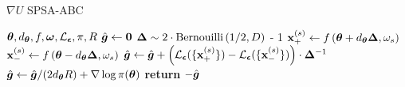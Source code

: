 \begin{algorithm}[t]
	\caption{$\nabla U$ SPSA-ABC}\label{algo:spsa}
	\begin{algorithmic}
		 ${\bm \theta}, d_{{\bm \theta}}, f, {\bm \omega}, \mathcal{L}_{{\bm {\epsilon}}}, \pi, R$ 
		\STATE $\hat{{\bm g }} \leftarrow {\bm 0}$
        \STATE ${\bm \Delta} \sim 2 \cdot \text{Bernouilli}\left( 1/2, D \right)$ - 1
          \STATE ${\bf x}^{(s)}_{+} \leftarrow f\left( {\bm \theta} + d_{{\bm \theta}} {\bm \Delta}, \omega_s \right)$
          \STATE ${\bf x}^{(s)}_{-} \leftarrow f\left( {\bm \theta} - d_{{\bm \theta}} {\bm \Delta}, \omega_s \right)$
        \ENDFOR
        \STATE $\hat{{\bm g }} \leftarrow \hat{{\bm g }} + \left( \mathcal{L}_{{\bm {\epsilon}}}( \{{\bf x}^{(s)}_{+}\}) - \mathcal{L}_{{\bm {\epsilon}}}( \{{\bf x}^{(s)}_{-}\}) \right) \cdot {\bm \Delta}^{-1}$
			\ENDFOR
    \STATE $\hat{{\bm g }} \leftarrow \hat{{\bm g }}/(2d_{{\bm \theta}} R) + \nabla \log \pi({\bm \theta})$
		\STATE \textbf{return} $-\hat{{\bm g }}$
	\end{algorithmic}
\end{algorithm}